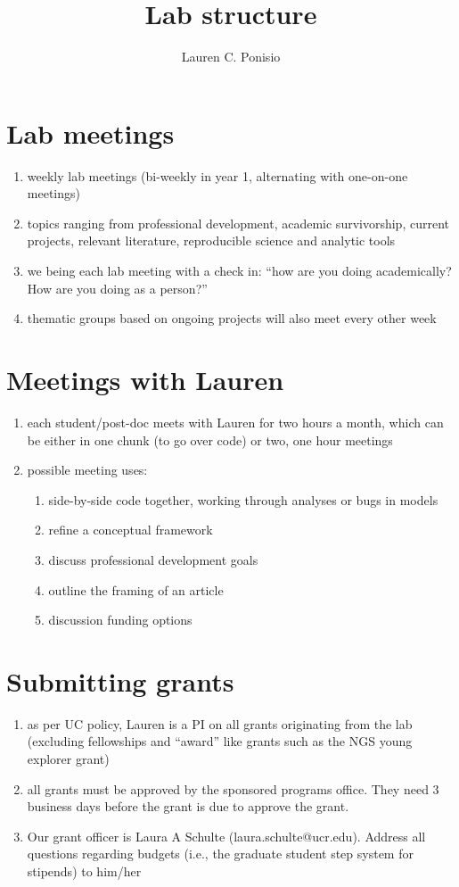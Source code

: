 \documentclass[12pt]{article}
\title{Lab structure}
\author{Lauren C. Ponisio}
\begin{document}
\maketitle

\section{Lab meetings}
\begin{enumerate}
\item weekly lab meetings (bi-weekly in year 1, alternating with
  one-on-one meetings)
\item topics ranging from professional development, academic
  survivorship, current projects, relevant literature, reproducible
  science and analytic tools
\item we being each lab meeting with a check in: ``how are you doing
  academically? How are you doing as a person?''
\item thematic groups based on ongoing projects will also meet every
  other week
\end{enumerate}

\section{Meetings with Lauren}
\begin{enumerate}
\item each student/post-doc meets with Lauren for two hours a month,
  which can be either in one chunk (to go over code) or two, one hour
  meetings
\item possible meeting uses:
  \begin{enumerate}
  \item side-by-side code together, working through analyses or bugs
    in models
  \item refine a conceptual framework
  \item discuss professional development goals
  \item outline the framing of an article
  \item discussion funding options
  \end{enumerate}
\end{enumerate}

\section{Submitting grants}
\begin{enumerate}
\item as per UC policy, Lauren is a PI on all grants originating from
  the lab (excluding fellowships and ``award'' like grants such as the
  NGS young explorer grant)
\item all grants must be approved by the sponsored programs
  office. They need 3 business days before the grant is due to
  approve the grant.
\item Our grant officer is Laura A Schulte
  (laura.schulte@ucr.edu). Address all questions regarding budgets
  (i.e., the graduate student step system for stipends) to him/her
\end{enumerate}
\end{document}
